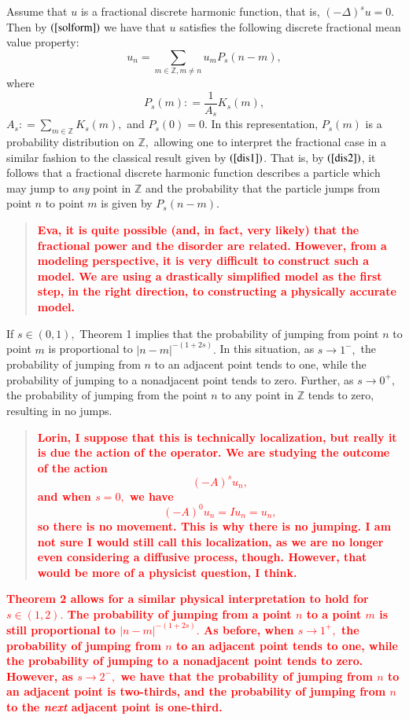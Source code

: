 \documentclass[final,1p,times]{elsarticle}
\def\ZZ{\mathbb Z} %
\newcommand{\bb}[1]{\begin{equation}\label{#1}}
\newcommand{\ee}{\end{equation}}
\def\R#1{$(\ref{#1})$}
\theoremstyle{remark}
\theoremstyle{definition}
\newcommand{\josh}[1]{\textcolor{red}{\textbf{#1}}}
\begin{document}
Assume that $u$ is a fractional discrete harmonic function, that is, $(-\Delta)^su = 0.$ Then by \R{solform} we have that $u$ satisfies the following discrete fractional mean value property:
\bb{dis2}
u_n = \sum_{m\in\ZZ,m\neq n}u_mP_s(n-m),
\ee
where
\bb{disp}
P_s(m)\mathrel{\mathop:}= \frac{1}{A_s}K_s(m),
\ee
$A_s \mathrel{\mathop:}= \textstyle\sum_{m\in\ZZ} K_s(m),$ and $P_s(0) = 0.$ In this representation, $P_s(m)$ is a probability distribution on $\ZZ,$ allowing one to interpret the fractional case in a similar fashion to the classical result given by \R{dis1}. That is, by \R{dis2}, it follows that a fractional discrete harmonic function describes a particle which may jump to {\em any} point in $\ZZ$ and the probability that the particle jumps from point $n$ to point $m$ is given by $P_s(n-m).$
\begin{quote}
\josh{Eva, it is quite possible (and, in fact, very likely) that the fractional power and the disorder are related. However, from a modeling perspective, it is very difficult to construct such a model. We are using a drastically simplified model as the first step, in the right direction, to constructing a physically accurate model.}
\end{quote}
If $s\in (0,1),$ Theorem 1 implies that the probability of jumping from point $n$ to point $m$ is proportional to $|n-m|^{-(1+2s)}.$ In this situation, as $s\to 1^-,$ the probability of jumping from $n$ to an adjacent point tends to one, while the probability of jumping to a nonadjacent point tends to zero. Further, as $s\to 0^+,$ the probability of jumping from the point $n$ to any point in $\ZZ$ tends to zero, resulting in no jumps.

\begin{quote}
\josh{Lorin, I suppose that this is technically localization, but really it is due the action of the operator. We are studying the outcome of the action
$$(-A)^s u_n,$$
and when $s = 0,$ we have
$$(-A)^0 u_n = I u_n = u_n,$$
so there is no movement. This is why there is no jumping. I am not sure I would still call this localization, as we are no longer even considering a diffusive process, though. However, that would be more of a physicist question, I think.}
\end{quote}

\josh{Theorem 2 allows for a similar physical interpretation to hold for $s\in (1,2).$ The probability of jumping from a point $n$ to a point $m$ is still proportional to $|n-m|^{-(1+2s)}.$ As before, when $s\to 1^+,$ the probability of jumping from $n$ to an adjacent point tends to one, while the probability of jumping to a nonadjacent point tends to zero. However, as $s\to 2^-,$ we have that the probability of jumping from $n$ to an adjacent point is two-thirds, and the probability of jumping from $n$ to the {\em next} adjacent point is one-third.}
\end{document}
